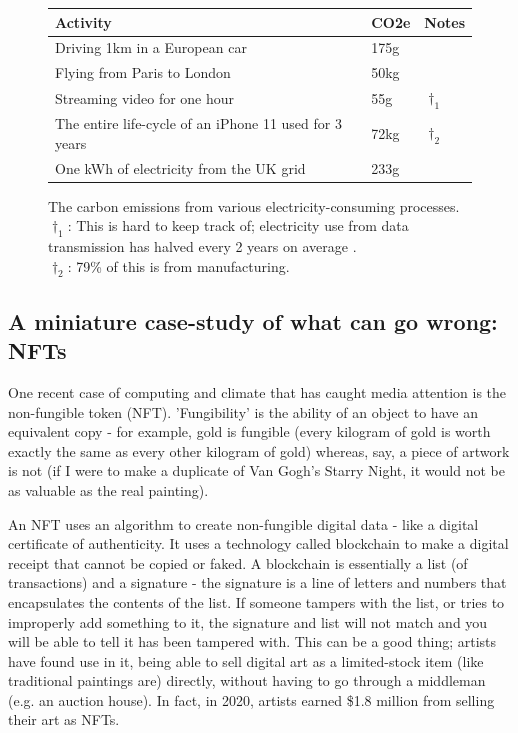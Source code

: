 \documentclass{article}
\begin{document}
\begin{figure}[!ht]
\begin{center}
\begin{tabular}{l l l}
  Activity & CO2e & Notes \\
  \hline\hline
  Driving 1km in a European car & 175g & \\
  Flying from Paris to London & 50kg & \\
  Streaming video for one hour & 55g & $\dag_1$ \\
  The entire life-cycle of an iPhone 11 used for 3 years & 72kg \citep{apple2019product} & $\dag_2$ \\
  One kWh of electricity from the UK grid & 233g \citep{uk2020greenhouse} & \\
\end{tabular}
\caption{The carbon emissions from various electricity-consuming processes.\\
 $\dag_1$: This is hard to keep track of; electricity use from data transmission has halved every 2 years on average \citep{aslan2018electricity}. \\
$\dag_2$: 79\% of this is from manufacturing.}
\end{center}
\end{figure}

\subsection{A miniature case-study of what can go wrong: NFTs}
One recent case of computing and climate that has caught media attention is the non-fungible token (NFT). 'Fungibility' is the ability of an object to have an equivalent copy - for example, gold is fungible (every kilogram of gold is worth exactly the same as every other kilogram of gold) whereas, say, a piece of artwork is not (if I were to make a duplicate of Van Gogh's Starry Night, it would not be as valuable as the real painting). \newline

An NFT uses an algorithm to create non-fungible digital data - like a digital certificate of authenticity. It uses a technology called blockchain to make a digital receipt that cannot be copied or faked. A blockchain is essentially a list (of transactions) and a signature - the signature is a line of letters and numbers that encapsulates the contents of the list. If someone tampers with the list, or tries to improperly add something to it, the signature and list will not match and you will be able to tell it has been tampered with.\citep{narayanan2017bitcoin} This can be a good thing; artists have found use in it, being able to sell digital art as a limited-stock item (like traditional paintings are) directly, without having to go through a middleman (e.g. an auction house). In fact, in 2020,  artists earned \$1.8 million \citep{redman2020NFT} from selling their art as NFTs.\newline
\end{document}
